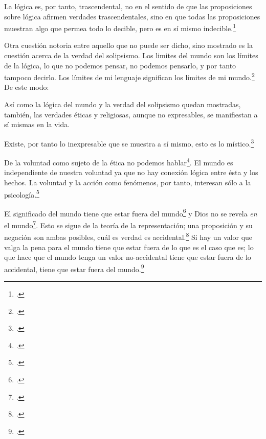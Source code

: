       La lógica es, por tanto, trascendental, no en el sentido de que las
      proposiciones sobre lógica afirmen verdades trascendentales, sino en que todas
      las proposiciones muestran algo que permea todo lo decible, pero es en sí mismo
      indecible.\footcite[cf.~][p.~166 \S2]{IWT}

      Otra cuestión notoria entre aquello que no puede ser dicho, sino mostrado es la
      cuestión acerca de la verdad del solipsismo. Los limites del mundo son los
      límites de la lógica, lo que no podemos pensar, no podemos pensarlo, y por tanto
      tampoco decirlo. Los límites de mi lenguaje significan los límites de mi
      mundo.\footcite[cf~.][5.6~y~5.61]{tractatus} De este modo:

      Así como la lógica del mundo y la verdad del solipsismo quedan mostradas,
      también, las verdades éticas y religiosas, aunque no expresables, se manifiestan
      a sí mismas en la vida. 

      Existe, por tanto lo inexpresable que se muestra a sí mismo, esto es lo
      místico.\footcite[cf.~][6.522]{tractatus}

      De la voluntad como sujeto de la ética no podemos
      hablar\footcite[cf.~][6.423]{tractatus}. El mundo es independiente de nuestra
      voluntad ya que no hay conexión lógica entre ésta y los hechos.
      La voluntad y la acción como fenómenos, por tanto, interesan sólo a la
      psicología.\footcite[cf.~][p.171 \S3]{IWT}

      El significado del mundo tiene que estar fuera del
      mundo\footcite[cf.~][6.41]{tractatus} y Dios no se revela \emph{en} el
      mundo\footcite[cf.~][6.432]{tractatus}. 
      Esto se sigue de la teoría de la representación; una proposición y su negación
      son ambas posibles, cuál es verdad es accidental.\footcite[cf.~][p.170 \S4]{IWT}
      Si hay un valor que valga la pena para el mundo tiene que estar fuera de lo que
      es el caso que es; lo que hace que el mundo tenga un valor no-accidental tiene
      que estar fuera de lo accidental, tiene que estar fuera del
      mundo.\footcite[cf.~][6.41]{tractatus} 

